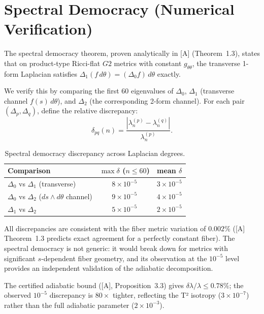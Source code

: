 \documentclass[11pt,a4paper]{article}
\newcommand{\Gtwo}{\mathrm{G}_2}
\def\Gtwo{G2}%
\begin{document}
\section{Spectral Democracy (Numerical Verification)}\label{sec:democracy}

The spectral democracy theorem, proven analytically in [A] (Theorem~1.3), states that on product-type Ricci-flat $\Gtwo$ metrics with constant $g_{\theta\theta}$, the transverse 1-form Laplacian satisfies $\Delta_1(f\, d\theta) = (\Delta_0 f)\, d\theta$ exactly.

We verify this by comparing the first 60 eigenvalues of $\Delta_0$, $\Delta_1$ (transverse channel $f(s)\,d\theta$), and $\Delta_2$ (the corresponding 2-form channel). For each pair $(\Delta_p, \Delta_q)$, define the relative discrepancy:
\begin{equation}
\delta_{pq}(n) = \frac{|\lambda_n^{(p)} - \lambda_n^{(q)}|}{\lambda_n^{(p)}}.
\end{equation}

\begin{table}[ht]
\centering
\begin{tabular}{lcc}
\toprule
Comparison & $\max \delta$ ($n \leq 60$) & mean $\delta$ \\
\midrule
$\Delta_0$ vs $\Delta_1$ (transverse) & $8 \times 10^{-5}$ & $3 \times 10^{-5}$ \\
$\Delta_0$ vs $\Delta_2$ ($ds \wedge d\theta$ channel) & $9 \times 10^{-5}$ & $4 \times 10^{-5}$ \\
$\Delta_1$ vs $\Delta_2$ & $5 \times 10^{-5}$ & $2 \times 10^{-5}$ \\
\bottomrule
\end{tabular}
\caption{Spectral democracy discrepancy across Laplacian degrees.}
\label{tab:democracy}
\end{table}

All discrepancies are consistent with the fiber metric variation of $0.002\%$ ([A] Theorem~1.3 predicts exact agreement for a perfectly constant fiber). The spectral democracy is not generic: it would break down for metrics with significant $s$-dependent fiber geometry, and its observation at the $10^{-5}$ level provides an independent validation of the adiabatic decomposition.

The certified adiabatic bound ([A], Proposition~3.3) gives $\delta\lambda/\lambda \leq 0.78\%$; the observed $10^{-5}$ discrepancy is $80\times$ tighter, reflecting the T² isotropy ($3 \times 10^{-7}$) rather than the full adiabatic parameter ($2 \times 10^{-3}$).
\end{document}
